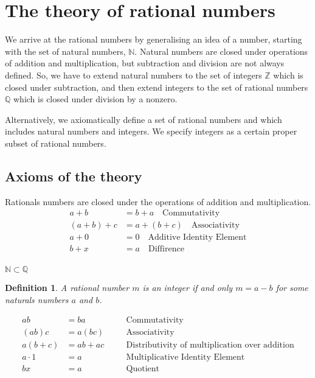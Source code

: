 \documentclass[letterpaper, 10pt]{article}
\newtheorem{define}[thm]{Definition}
\begin{document}
	\section{The theory of rational numbers}
	We arrive at the rational numbers by generalising an idea of a number,
	starting with the set of natural numbers, $\mathbb{N}$.
	Natural numbers are closed under operations of addition and
	multiplication, but subtraction and division are not always defined.
	So, we have to extend natural numbers to the set of integers
	$\mathbb{Z}$ which is closed under subtraction, and then extend integers to
	the set of rational numbers $\mathbb{Q}$ which is closed under division by a
	nonzero.

	Alternatively, we axiomatically define a set of rational numbers and which
	includes natural numbers and integers. We specify integers as a certain
	proper subset of rational numbers.

	\subsection{Axioms of the theory}

	Rationals numbers are closed under the operations of addition and
	multiplication.
	\begin{align*}
		a + b &= b + a \quad \text{Commutativity} \\
		(a + b) + c &= a + (b + c) \quad \text{Associativity} \\
		a + 0 &= 0 \quad \text{Additive Identity Element} \\
		b + x & = a \quad \text{Diffirence} \\
	\end{align*}

	$\mathbb{N} \subset \mathbb{Q}$
	\begin{define}
		A rational number $m$ is an integer if and only $m = a - b$ for some
		naturals numbers $a$ and $b$.
	\end{define}
	
	\begin{align*}
		ab &= ba &&\quad \text{Commutativity}\\
		(ab)c &= a(bc) &&\quad \text{Associativity}\\
		a(b+c) &= ab + ac &&\quad \text{Distributivity
		of multiplication over addition}\\
		a \cdot 1 &= a &&\quad \text{Multiplicative Identity Element}\\
		bx &= a &&\quad \text{Quotient}
	\end{align*}
\end{document}
